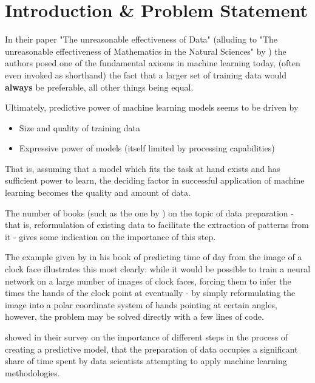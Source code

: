 \chapter{Introduction \& Problem Statement}
\label{chapter:intro}

In their paper "The unreasonable effectiveness of Data" \cite{norvig_eod} (alluding to "The unreasonable effectiveness of Mathematics in the Natural Sciences" by \cite{mathematics_unreasonable}) the authors posed one of the fundamental axioms in machine learning today, (often even invoked as shorthand) the fact that a larger set of training data would \textbf{always} be preferable, all other things being equal.

Ultimately, predictive power of machine learning models seems to be driven by

\begin{itemize}
	\item Size and quality of training data
	\item Expressive power of models (itself limited by processing capabilities)
\end{itemize}

That is, assuming that a model which fits the task at hand exists and has sufficient power to learn, the deciding factor in successful application of machine learning becomes the quality and amount of data.

The number of books (such as the one by \cite{dataprep}) on the topic of data preparation - that is, reformulation of existing data to facilitate the extraction of patterns from it -  gives some indication on the importance of this step. 

\pagebreak

The example given by \cite{geron2019hands} in his book of predicting time of day from the image of a clock face illustrates this most clearly: while it would be possible to train a neural network on a large number of images of clock faces, forcing them to infer the times the hands of the clock point at eventually - by simply reformulating the image into a polar coordinate system of hands pointing at certain angles, however, the problem may be solved directly with a few lines of code.

\cite{datawrangling_time} showed in their survey on the importance of different steps in the process of creating a predictive model, that the preparation of data occupies a significant share of time spent by data scientists attempting to apply machine learning methodologies.

